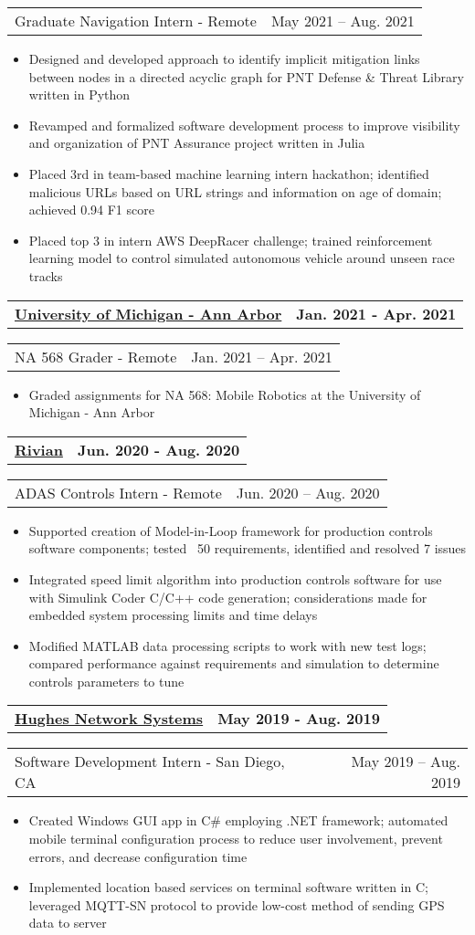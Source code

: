 \documentclass[letterpaper,11pt]{article}
\makeatletter
\newcommand{\resumeItem}[1]{
	\item\small{
		#1
	}
}
\newcommand{\resumeCompanyHeading}[2]{
  \vspace{-1pt}\item
    \begin{tabular*}{0.97\textwidth}[t]{l@{\extracolsep{\fill}}r}
      \textbf{#1} & \textbf{#2} \\
    \end{tabular*}\vspace{-0pt}
}
\newcommand{\resumeJobHeading}[3]{
	\vspace{-1pt}
	\begin{tabular*}{0.97\textwidth}[t]{l@{\extracolsep{\fill}}r}
		{\small#1} - {\small #2} & {\small #3} \\
	\end{tabular*}\vspace{-4pt}
}
\newcommand{\resumeItemListStart}{\begin{itemize}}
\newcommand{\resumeItemListEnd}{\end{itemize}\vspace{-4pt}}
\makeatother
\begin{document}
    \resumeJobHeading{Graduate Navigation Intern}{Remote}{May 2021 -- Aug. 2021}
    \resumeItemListStart
      \resumeItem{Designed and developed approach to identify implicit mitigation links between nodes in a directed acyclic graph for PNT Defense \& Threat Library written in Python}
      \resumeItem{Revamped and formalized software development process to improve visibility and organization of PNT Assurance project written in Julia}
      \resumeItem{Placed 3rd in team-based machine learning intern hackathon; identified malicious URLs based on URL strings and information on age of domain; achieved 0.94 F1 score}
      \resumeItem{Placed top 3 in intern AWS DeepRacer challenge; trained reinforcement learning model to control simulated autonomous vehicle around unseen race tracks}
    \resumeItemListEnd

  \resumeCompanyHeading{\href{https://umich.edu/}{University of Michigan - Ann Arbor}}{Jan. 2021 - Apr. 2021}
    \resumeJobHeading{NA 568 Grader}{Remote}{Jan. 2021 -- Apr. 2021}
    \resumeItemListStart
      \resumeItem{Graded assignments for NA 568: Mobile Robotics at the University of Michigan - Ann Arbor}
    \resumeItemListEnd

  \resumeCompanyHeading{\href{https://rivian.com/}{Rivian}}{Jun. 2020 - Aug. 2020}
    \resumeJobHeading{ADAS Controls Intern}{Remote}{Jun. 2020 -- Aug. 2020}
    \resumeItemListStart
      \resumeItem{Supported creation of Model-in-Loop framework for production controls software components; tested ~50 requirements, identified and resolved 7 issues}
      \resumeItem{Integrated speed limit algorithm into production controls software for use with Simulink Coder C/C++ code generation; considerations made for embedded system processing limits and time delays}
      \resumeItem{Modified MATLAB data processing scripts to work with new test logs; compared performance against requirements and simulation to determine controls parameters to tune}
    \resumeItemListEnd

  \resumeCompanyHeading{\href{https://www.hughes.com/}{Hughes Network Systems}}{May 2019 - Aug. 2019}
    \resumeJobHeading{Software Development Intern}{San Diego, CA}{May 2019 -- Aug. 2019}
    \resumeItemListStart
      \resumeItem{Created Windows GUI app in C\# employing .NET framework; automated mobile terminal configuration process to reduce user involvement, prevent errors, and decrease configuration time}
      \resumeItem{Implemented location based services on terminal software written in C; leveraged MQTT-SN protocol to provide low-cost method of sending GPS data to server}
    \resumeItemListEnd
\end{document}
